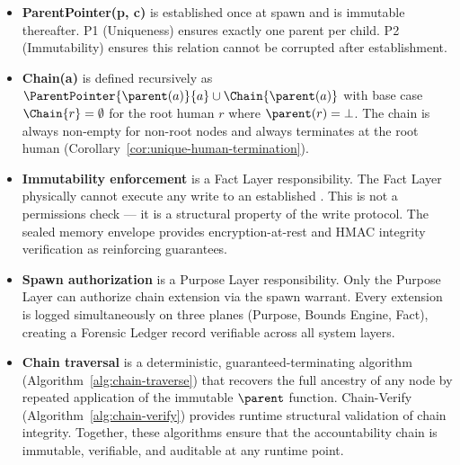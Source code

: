 \begin{itemize}[noitemsep]
    \item \textbf{ParentPointer(p, c)} is established once at spawn and is immutable thereafter. P1 (Uniqueness) ensures exactly one parent per child. P2 (Immutability) ensures this relation cannot be corrupted after establishment.

    \item \textbf{Chain(a)} is defined recursively as $\ParentPointer{\parent(a)}{a} \cup \Chain{\parent(a)}$ with base case $\Chain{r} = \emptyset$ for the root human $r$ where $\parent(r) = \bot$. The chain is always non-empty for non-root nodes and always terminates at the root human (Corollary~\ref{cor:unique-human-termination}).

    \item \textbf{Immutability enforcement} is a Fact Layer responsibility. The Fact Layer physically cannot execute any write to an established \ParentPointer. This is not a permissions check --- it is a structural property of the write protocol. The sealed memory envelope provides encryption-at-rest and HMAC integrity verification as reinforcing guarantees.

    \item \textbf{Spawn authorization} is a Purpose Layer responsibility. Only the Purpose Layer can authorize chain extension via the spawn warrant. Every extension is logged simultaneously on three planes (Purpose, Bounds Engine, Fact), creating a Forensic Ledger record verifiable across all system layers.

    \item \textbf{Chain traversal} is a deterministic, guaranteed-terminating algorithm (Algorithm~\ref{alg:chain-traverse}) that recovers the full ancestry of any node by repeated application of the immutable $\parent$ function. Chain-Verify (Algorithm~\ref{alg:chain-verify}) provides runtime structural validation of chain integrity. Together, these algorithms ensure that the accountability chain is immutable, verifiable, and auditable at any runtime point.
\end{itemize}
